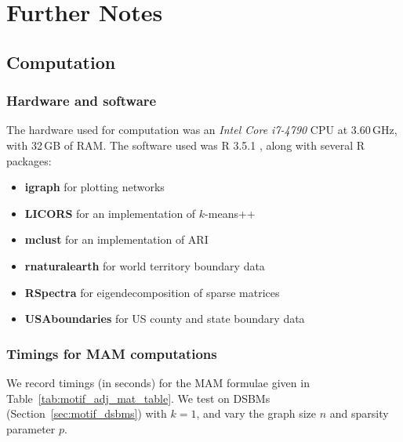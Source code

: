 \documentclass[12pt,draft]{ociamthesis}
\theoremstyle{plain}
\theoremstyle{definition}
\theoremstyle{remark}
\begin{document}
\chapter{Further Notes}

\section{Computation} \label{sec:notes_computation}

\subsection{Hardware and software} \label{sec:notes_hardware}

The hardware used for computation was an \emph{Intel Core i7-4790} CPU at
3.60\,GHz, with 32\,GB of RAM. The software used was R 3.5.1
\cite{r_rsoftware}, along with several R packages:
%
%
\begin{itemize}
  \item \textbf{igraph} \cite{r_igraph} for plotting networks
  \item \textbf{LICORS} \cite{r_LICORS} for an implementation of $k$-means++
  \item \textbf{mclust} \cite{r_mclust} for an implementation of ARI
  \item
    \textbf{rnaturalearth} \cite{r_rnaturalearth} for world territory boundary
    data
  \item \textbf{RSpectra} \cite{r_RSpectra} for eigendecomposition of
    sparse matrices
  \item \textbf{USAboundaries} \cite{r_USAboundaries} for US
    county and state boundary data
\end{itemize}

\subsection{Timings for MAM computations} \label{sec:notes_timing}

We record timings (in seconds) for the MAM formulae given in
Table~\ref{tab:motif_adj_mat_table}. We test on DSBMs
(Section~\ref{sec:motif_dsbms}) with $k=1$, and vary the graph size $n$ and
sparsity parameter $p$.
\end{document}

